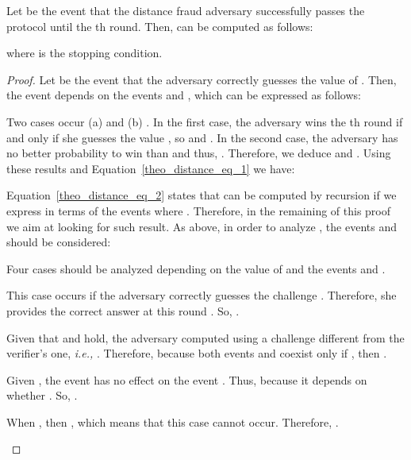 \documentclass{llncs}
\begin{document}
\begin{theorem}\label{theo_distance}
Let  be the event that the distance fraud adversary successfully passes 
the protocol until the th round. Then,  can be computed as follows:


where  is the stopping condition.
\end{theorem}


\begin{proof}

Let  be the event that the adversary correctly guesses the value of 
. Then, the event  depends on the events  and 
, which can be expressed as follows:


\noindent Two cases occur (a)  and (b) . In 
the first case, the adversary wins the th round if and only if she guesses 
the value , so  
and . In the second case, 
the adversary has no better probability to win than  and thus, 
. Therefore, we deduce  and . 
Using these results and  Equation~\ref{theo_distance_eq_1} we have:


\noindent Equation~\ref{theo_distance_eq_2} states that  can be 
computed by recursion if we express  in terms of the 
events  where . Therefore, in the remaining of this proof we 
aim at looking for such result. As above, in order to analyze , the events  and  should be considered:



\noindent Four cases should be analyzed depending on the value of  and the 
events  and . 

\begin{case}\label{case1}
This case occurs if the adversary correctly guesses the challenge . 
Therefore, she provides the correct answer at this round . So, .
\end{case}

\begin{case}\label{case2}
Given that  and  hold, the adversary computed  using a challenge different from the 
verifier's one, \emph{i.e.,} . Therefore,  because both events 
 and  coexist only if , then .
\end{case}


\begin{case}\label{case3}
Given , the event  has no effect on the event . Thus, 
 because it depends on whether . So, 
.
\end{case}

\begin{case}\label{case4}
When , then , which means that this case 
cannot occur. Therefore, .
\end{case}




\end{proof}
\end{document}
